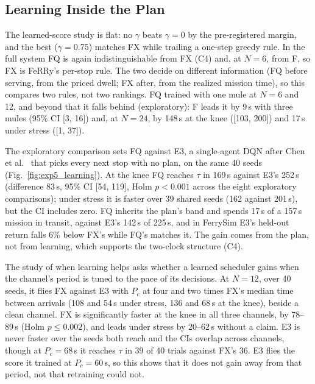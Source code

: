 
\subsection{Learning Inside the Plan}
\label{sec:res:rl}

The learned-score study is flat: no $\gamma$ beats $\gamma=0$ by the
pre-registered margin, and the best ($\gamma=0.75$) matches FX while trailing a
one-step greedy rule. In the full system FQ is again indistinguishable from FX
(C4) and, at $N=6$, from F, so FX is FeRRy's per-stop rule. The two decide on
different information (FQ before serving, from the priced dwell; FX after, from
the realized mission time), so this compares two rules, not two rankings. FQ
trained with one mule at $N=6$ and 12, and beyond that it falls behind
(exploratory): F leads it by 9\,s with three mules (95\% CI [3, 16]) and, at
$N=24$, by 148\,s at the knee ([103, 200]) and 17\,s under stress ([1, 37]).

The exploratory comparison sets FQ against E3, a single-agent DQN after Chen et
al.~\cite{chen2023model} that picks every next stop with no plan, on the same 40
seeds (Fig.~\ref{fig:exp5_learning}). At the knee FQ reaches $\tau$ in 169\,s
against E3's 252\,s (difference 83\,s, 95\% CI [54, 119], Holm $p<0.001$ across
the eight exploratory comparisons); under stress it is faster over 39 shared
seeds (162 against 201\,s), but the CI includes zero. FQ inherits the plan's
band and spends 17\,s of a 157\,s mission in transit, against E3's 142\,s of
225\,s, and in FerrySim E3's held-out return falls 6\% below FX's while FQ's
matches it. The gain comes from the plan, not from learning, which supports the
two-clock structure (C4).

The study of when learning helps asks whether a learned scheduler gains when the
channel's period is tuned to the pace of its decisions. At $N=12$, over 40 seeds,
it flies FX against E3 with $P_c$ at four and two times FX's median time between
arrivals (108 and 54\,s under stress, 136 and 68\,s at the knee), beside a clean
channel. FX is significantly faster at the knee in all
three channels, by 78--89\,s (Holm $p\le0.002$), and leads under stress by
20--62\,s without a claim. E3 is never faster over the seeds both reach and the
CIs overlap across channels, though at $P_c=68$\,s it reaches $\tau$ in 39 of 40
trials against FX's 36. E3 flies the score it trained at $P_c=60$\,s, so this
shows that it does not gain away from that period, not that retraining could not.

